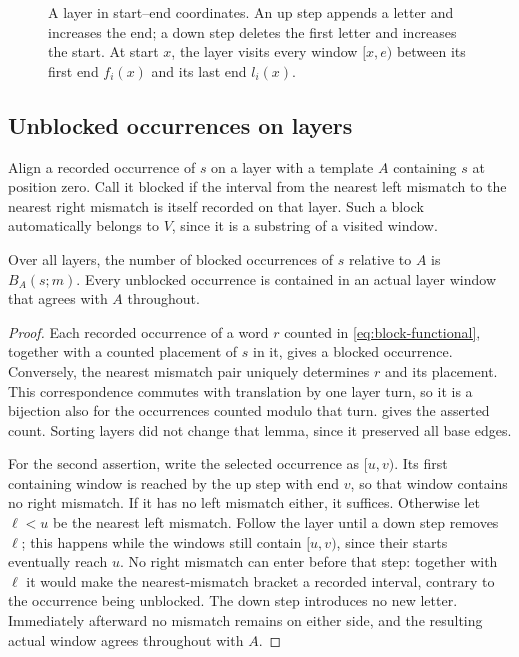 \begin{figure}[htbp]
\centering

\caption{A layer in start--end coordinates. An up step appends a letter and increases the end; a down step deletes the first letter and increases the start. At start $x$, the layer visits every window $[x,e)$ between its first end $f_i(x)$ and its last end $l_i(x)$.}
\label{fig:layers}
\end{figure}

\subsection{Unblocked occurrences on layers}

Align a recorded occurrence of $s$ on a layer with a template $A$ containing $s$ at position zero. Call it blocked if the interval from the nearest left mismatch to the nearest right mismatch is itself recorded on that layer. Such a block automatically belongs to $V$, since it is a substring of a visited window.

\begin{lemma}\label{lem:matching-window}
Over all layers, the number of blocked occurrences of $s$ relative to $A$ is $B_A(s;m)$. Every unblocked occurrence is contained in an actual layer window that agrees with $A$ throughout.
\end{lemma}

\begin{proof}
Each recorded occurrence of a word $r$ counted in \eqref{eq:block-functional}, together with a counted placement of $s$ in it, gives a blocked occurrence. Conversely, the nearest mismatch pair uniquely determines $r$ and its placement. This correspondence commutes with translation by one layer turn, so it is a bijection also for the occurrences counted modulo that turn.  gives the asserted count. Sorting layers did not change that lemma, since it preserved all base edges.

For the second assertion, write the selected occurrence as $[u,v)$. Its first containing window is reached by the up step with end $v$, so that window contains no right mismatch. If it has no left mismatch either, it suffices. Otherwise let $\ell<u$ be the nearest left mismatch. Follow the layer until a down step removes $\ell$; this happens while the windows still contain $[u,v)$, since their starts eventually reach $u$. No right mismatch can enter before that step: together with $\ell$ it would make the nearest-mismatch bracket a recorded interval, contrary to the occurrence being unblocked. The down step introduces no new letter. Immediately afterward no mismatch remains on either side, and the resulting actual window agrees throughout with $A$.
\end{proof}


